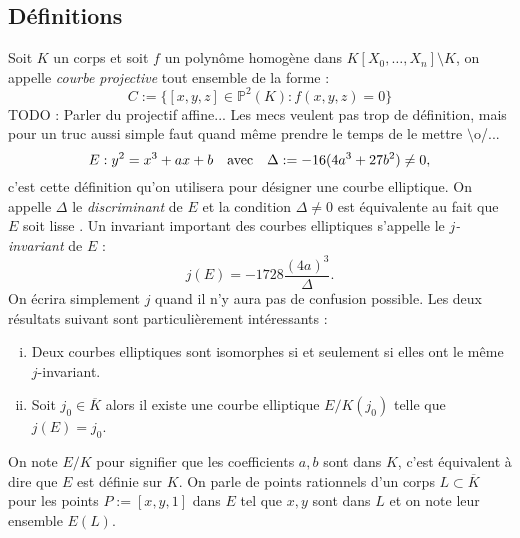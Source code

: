 \documentclass[a4paper]{article} %
\numberwithin{section}{part}
\numberwithin{equation}{section}
\newcommand\PP[1]{\mathbb{P}^{#1}}
\begin{document}
\subsection{Définitions}
Soit $K$ un corps et soit $f$ un polynôme homogène dans
$K[X_0,\dots,X_n]\setminus K$, 
on appelle \emph{courbe projective} tout ensemble de la forme :
\begin{equation}
C := \lbrace{[x,y,z]\in \PP{2}(K) : f(x,y,z) = 0}\rbrace
\end{equation}
TODO : Parler du projectif affine... Les mecs veulent pas trop de définition,
mais pour un truc aussi simple faut quand même prendre le temps de le mettre
$\setminus$o/...
\begin{equation}
\label{eq:weiersimpl}
E : y^2 = x^3 + ax + b\quad\textup{avec}\quad \Delta := -16(4a^3 + 27b^2)\neq 0,
\end{equation}
c'est cette définition qu'on utilisera pour désigner une courbe elliptique. On
appelle $\Delta$ le \emph{discriminant} de $E$ et la condition $\Delta\neq0$ est
équivalente au fait que $E$ soit lisse \cite[Chap. III, prop. 1.4]{Sil}. Un 
invariant important des courbes elliptiques s'appelle le \emph{$j$-invariant} de
$E$ :
\begin{equation}
j(E) = -1728\dfrac{(4a)^3}{\Delta}.
\end{equation}
On écrira simplement $j$ quand il n'y aura pas de confusion possible. Les deux
résultats suivant sont particulièrement intéressants :
\begin{prop}
\label{prop:j-invariant}
\begin{enumerate}[(i)]
    \item Deux courbes elliptiques sont isomorphes si et seulement si elles ont
    le même $j$-invariant.
    \item Soit $j_0\in\overline{K}$ alors il existe une courbe elliptique
    $E/K(j_0)$ telle que $j(E) = j_0$.
\end{enumerate}
\end{prop}
On note $E/K$ pour signifier que les coefficients $a, b$ sont dans $K$, c'est
équivalent à dire que $E$ est définie sur $K$. On parle de points rationnels 
d'un corps $L\subset\overline{K}$ pour les points
$P := [x,y,1]$ dans $E$ tel que $x, y$ sont dans $L$ et on note leur ensemble
$E(L)$.\par
\end{document}
